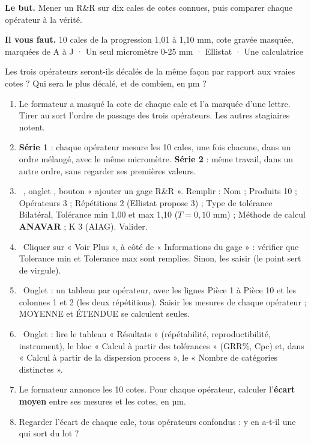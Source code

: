 \documentclass[10pt,a4paper]{article}
\begin{document}
\thispagestyle{fancy}
\begin{tcolorbox}[boite]\textbf{Le but.} Mener un R\&R sur dix cales de cotes connues, puis comparer chaque opérateur à la vérité.\par\textbf{Il vous faut.} 10 cales de la progression 1,01 à 1,10 mm, cote gravée masquée, marquées de A à J · Un seul micromètre 0-25 mm · Ellistat · Une calculatrice\end{tcolorbox}
\begin{tcolorbox}[pred]Les trois opérateurs seront-ils décalés de la même façon par rapport aux vraies cotes ? Qui sera le plus décalé, et de combien, en µm ?\reponse\end{tcolorbox}
\begin{enumerate}[label=\textcolor{cyan}{\textbf{\arabic*.}},leftmargin=15pt,itemsep=1.5pt]
\item Le formateur a masqué la cote de chaque cale et l'a marquée d'une lettre. Tirer au sort l'ordre de passage des trois opérateurs. Les autres stagiaires notent.
\item \textbf{Série 1} : chaque opérateur mesure les 10 cales, une fois chacune, dans un ordre mélangé, avec le même micromètre. \textbf{Série 2} : même travail, dans un autre ordre, sans regarder ses premières valeurs.
\item \tagE\ , onglet , bouton « ajouter un gage R\&R ». Remplir : Nom ; Produits 10 ; Opérateurs 3 ; Répétitions 2 (Ellistat propose 3) ; Type de tolérance Bilatéral, Tolérance min 1,00 et max 1,10 ($T = 0{,}10$ mm) ; Méthode de calcul \textbf{ANAVAR} ; K 3 (AIAG). Valider.
\item \tagE\ Cliquer sur « Voir Plus », à côté de « Informations du gage » : vérifier que Tolerance min et Tolerance max sont remplies. Sinon, les saisir (le point sert de virgule).
\item \tagE\ Onglet  : un tableau par opérateur, avec les lignes Pièce 1 à Pièce 10 et les colonnes 1 et 2 (les deux répétitions). Saisir les mesures de chaque opérateur ; MOYENNE et ÉTENDUE se calculent seules.
\item \tagE\ Onglet  : lire le tableau « Résultats » (répétabilité, reproductibilité, instrument), le bloc « Calcul à partir des tolérances » (GRR\%, Cpc) et, dans « Calcul à partir de la dispersion process », le « Nombre de catégories distinctes ».
\item Le formateur annonce les 10 cotes. Pour chaque opérateur, calculer l'\textbf{écart moyen} entre ses mesures et les cotes, en µm.
\item Regarder l'écart de chaque cale, tous opérateurs confondus : y en a-t-il une qui sort du lot ?
\end{enumerate}
\end{document}
